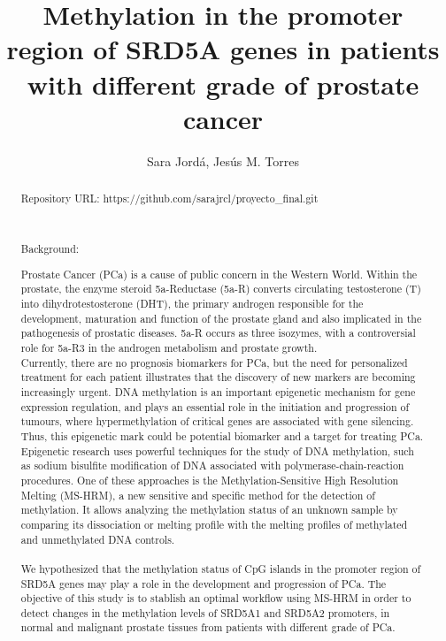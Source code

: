 \documentclass[a4paper,11pt]{article}
\begin{document}
 \title{Methylation in the promoter region of SRD5A genes in patients with different grade of prostate cancer} \author{Sara Jordá, Jesús M. Torres} \maketitle
	\begin{abstract}
		\begin{bf}Repository URL: https://github.com/sarajrcl/proyecto\_final.git \end{bf} \\ 
	
	\begin{bf}Background: \end{bf}Prostate Cancer (PCa) is a cause of public concern in the Western World. Within the prostate, the enzyme steroid 5a-Reductase (5a-R) converts circulating testosterone (T) into dihydrotestosterone (DHT), the primary androgen responsible for the development, maturation and function of the prostate gland and also implicated in the pathogenesis of prostatic diseases. 5a-R occurs as three isozymes, with a controversial role for 5a-R3 in the androgen metabolism and prostate growth. \\
		Currently, there are no prognosis biomarkers for PCa, but the need for personalized treatment for each patient illustrates that the discovery of new markers are becoming increasingly urgent. DNA methylation is an important epigenetic mechanism for gene expression regulation, and plays an essential role in the initiation and progression of tumours, where hypermethylation of critical genes are associated with gene silencing. Thus, this epigenetic mark could be potential biomarker and a target for treating PCa. Epigenetic research uses powerful techniques for the study of DNA methylation, such as sodium bisulfite modification of DNA associated with polymerase-chain-reaction procedures. One of these approaches is the Methylation-Sensitive High Resolution Melting (MS-HRM), a new sensitive and specific method for the detection of methylation. It allows analyzing the methylation status of an unknown sample by comparing its dissociation or melting profile with the melting profiles of methylated and unmethylated DNA controls. \\ \\
		We hypothesized that the methylation status of CpG islands in the promoter region of SRD5A genes may play a role in the development and progression of PCa. The objective of this study is to stablish an optimal workflow using MS-HRM in order to detect changes in the methylation levels of SRD5A1 and SRD5A2 promoters, in normal and malignant prostate tissues from patients with different grade of PCa. \\
		

\end{abstract}
\end{document}
